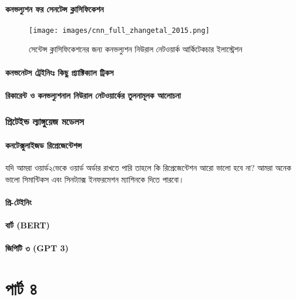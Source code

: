 \documentclass{article}[book]
\begin{document}
\subsection{কনভল্যুশন ফর সেনটেন্স ক্লাসিফিকেশন}

\begin{figure}[htbp] %
   \centering
   \texttt{[image: images/cnn\_full\_zhangetal\_2015.png]} 
   \caption{সেন্টেন্স ক্লাসিফিকেশনের জন্য কনভল্যুশন নিউরাল নেটওয়ার্ক আর্কিটেকচার ইলাস্ট্রেশন}
   \label{fig:cnn_zhangetal} 
\end{figure} 

\subsection{কনভনেটস ট্রেইনিংঃ  কিছু প্র্যাক্টিক্যাল ট্রিকস}

\subsection{রিকারেন্ট ও কনভল্যুশনাল নিউরাল নেটওয়ার্কের তুলনামূলক আলোচনা}

\section{প্রিটেইন্ড ল্যাঙ্গুয়েজ মডেলস}
\subsection{কনটেক্সুলাইজড রিপ্রেজেন্টেশন্স}
যদি আমরা ওয়ার্ড২ভেকে ওয়ার্ড অর্ডার রাখতে পারি তাহলে কি রিপ্রেজেন্টেশন আরো ভালো হবে না? আমরা অনেক ভালো সিমান্টিকস এবং সিনট্যাক্স 
ইনফরমেশন ম্যাশিনকে দিতে পারবো। 

\subsection{প্রি-টেইনিং}

\subsection{বার্ট (BERT)}

\subsection{জিপিটি ৩ (GPT 3)}


 \part{পার্ট ৪} 
\end{document}
